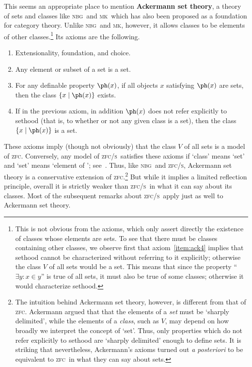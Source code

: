 \documentclass{amsart}
\def\zfc{\textsc{zfc}}
\def\zfcs{\textsc{zfc/s}}
\def\nbg{\textsc{nbg}}
\def\mk{\textsc{mk}}
\begin{document}
\begin{rmk}
  This seems an appropriate place to mention \textbf{Ackermann set
    theory}, a theory of sets and classes like \nbg\ and \mk\ which
  has also been proposed as a foundation for category theory.  Unlike
  \nbg\ and \mk, however, it allows classes to be elements of other
  classes.\footnote{This is not obvious from the axioms, which only
    assert directly the existence of classes whose elements are sets.
    To see that there must be classes containing other classes, we
    observe first that axiom~\ref{item:ack4} implies that sethood
    cannot be characterized without referring to it explicitly;
    otherwise the class $V$ of all sets would be a set.  This means
    that since the property ``$\exists y: x\in y$'' is true of all
    sets, it must also be true of some classes; otherwise it would
    characterize sethood.} Its axioms are the following.
  \begin{enumerate}
  \item Extensionality, foundation, and choice.
  \item Any element or subset of a set is a set.
  \item For any definable property $\ph(x)$, if all objects $x$
    satisfying $\ph(x)$ are sets, then the class $\{x\mid \ph(x)\}$
    exists.
  \item If in the previous axiom, in addition $\ph(x)$ does not refer
    explicitly to sethood (that is, to whether or not any given class is
    a set), then the class $\{x\mid \ph(x)\}$ is a set.\label{item:ack4}
  \end{enumerate}
  These axioms imply (though not obviously) that the class $V$ of all
  sets is a model of \zfc.  Conversely, any model of \zfcs\ satisfies
  these axioms if `class' means `set' and `set' means `element of
  \bbS'; see~\cite{levy:ackermann,reinhardt:ackermann}.  Thus, like
  \nbg\ and \zfcs, Ackermann set theory is a conservative extension of
  \zfc.\footnote{The intuition behind Ackermann set theory, however,
    is different from that of \zfc.  Ackermann argued that that the
    elements of a \emph{set} must be `sharply delimited', while the
    elements of a \emph{class}, such as $V$, may depend on how broadly
    we interpret the concept of `set'.  Thus, only properties which do
    not refer explicitly to sethood are `sharply delimited' enough to
    define sets.  It is striking that nevertheless, Ackermann's axioms
    turned out \emph{a posteriori} to be equivalent to \zfc\ in what
    they can say about sets.}  But while it implies a limited
  reflection principle, overall it is strictly weaker than \zfcs\ in
  what it can say about its classes.  Most of the subsequent remarks
  about \zfcs\ apply just as well to Ackermann set theory.
\end{rmk}
\end{document}
